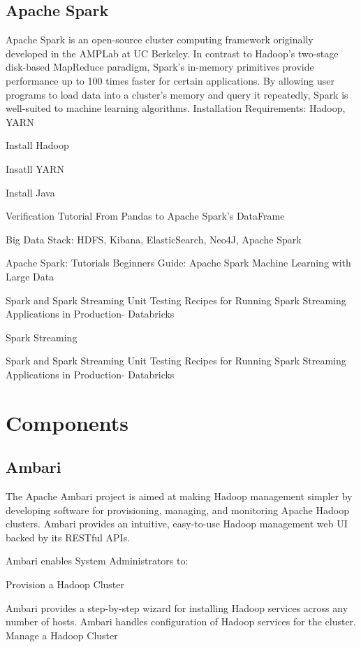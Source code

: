 \subsection{Apache Spark}




Apache Spark is an open-source cluster computing framework originally developed in the AMPLab at UC Berkeley. In contrast to Hadoop's two-stage disk-based MapReduce paradigm, Spark's in-memory primitives provide performance up to 100 times faster for certain applications. By allowing user programs to load data into a cluster's memory and query it repeatedly, Spark is well-suited to machine learning algorithms.
Installation
Requirements: Hadoop, YARN

Install Hadoop

Insatll YARN

Install Java

Verification
Tutorial
From Pandas to Apache Spark’s DataFrame

Big Data Stack: HDFS, Kibana, ElasticSearch, Neo4J, Apache Spark

Apache Spark: Tutorials
Beginners Guide: Apache Spark Machine Learning with Large Data


Spark and Spark Streaming Unit Testing Recipes for Running Spark Streaming Applications in Production- Databricks

Spark Streaming


Spark and Spark Streaming Unit Testing Recipes for Running Spark Streaming Applications in Production- Databricks

\section{Components}

\subsection{Ambari}

The Apache Ambari project is aimed at making Hadoop management simpler by developing software for provisioning, managing, and monitoring Apache Hadoop clusters. Ambari provides an intuitive, easy-to-use Hadoop management web UI backed by its RESTful APIs.

Ambari enables System Administrators to:

Provision a Hadoop Cluster

Ambari provides a step-by-step wizard for installing Hadoop services across any number of hosts.
Ambari handles configuration of Hadoop services for the cluster.
Manage a Hadoop Cluster

